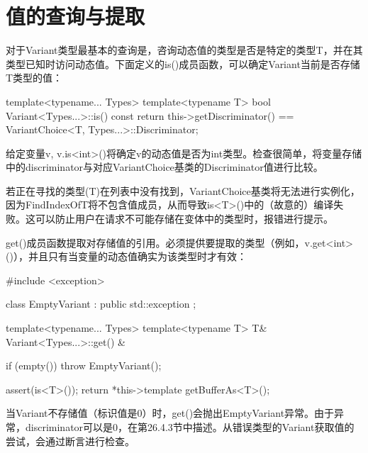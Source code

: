 \section{值的查询与提取}
对于Variant类型最基本的查询是，咨询动态值的类型是否是特定的类型T，并在其类型已知时访问动态值。下面定义的is()成员函数，可以确定Variant当前是否存储T类型的值：

\begin{cpp}
template<typename... Types>
template<typename T>
bool Variant<Types...>::is() const
{
	return this->getDiscriminator() ==
	VariantChoice<T, Types...>::Discriminator;
}
\end{cpp}

给定变量v, v.is<int>()将确定v的动态值是否为int类型。检查很简单，将变量存储中的discriminator与对应VariantChoice基类的Discriminator值进行比较。

若正在寻找的类型(T)在列表中没有找到，VariantChoice基类将无法进行实例化，因为FindIndexOfT将不包含值成员，从而导致is<T>()中的（故意的）编译失败。这可以防止用户在请求不可能存储在变体中的类型时，报错进行提示。

get()成员函数提取对存储值的引用。必须提供要提取的类型（例如，v.get<int>()），并且只有当变量的动态值确实为该类型时才有效：

\begin{cpp}
#include <exception>

class EmptyVariant : public std::exception {
};

template<typename... Types>
template<typename T>
T& Variant<Types...>::get() & {
	if (empty()) {
		throw EmptyVariant();
	}

	assert(is<T>());
	return *this->template getBufferAs<T>();
}
\end{cpp}

当Variant不存储值（标识值是0）时，get()会抛出EmptyVariant异常。由于异常，discriminator可以是0，在第26.4.3节中描述。从错误类型的Variant获取值的尝试，会通过断言进行检查。













































